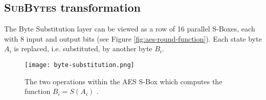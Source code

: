 \subsection{\textsc{SubBytes} transformation}
\label{sec:SubBytes}

The Byte Substitution layer can be viewed as a row of 16 parallel S-Boxes, each with 8 input and output bits (see Figure \ref{fig:aes-round-function}). 
Each state byte $A_i$ is replaced, i.e. substituted, by another byte $B_i$.

\begin{figure}[!ht] 
    \centering
    \texttt{[image: byte-substitution.png]} 
    \caption{
        The two operations within the AES S-Box which computes the function $B_i = S(A_i)$ \cite{Paar2024}.
    }
    \label{fig:byte-substitution} 
\end{figure}


